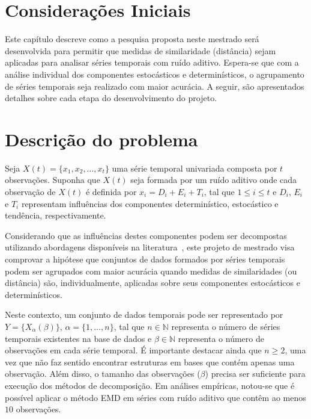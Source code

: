 \label{plano}

\section{Considerações Iniciais}



Este capítulo descreve como a pesquisa proposta neste mestrado será desenvolvida para permitir que medidas de similaridade (distância) sejam aplicadas para analisar séries temporais com ruído aditivo. Espera-se que com a análise individual dos componentes estocásticos e determinísticos, o agrupamento de séries temporais seja realizado com maior acurácia. A seguir, são apresentados detalhes sobre cada etapa do desenvolvimento do projeto.

\section{Descrição do problema}

Seja $X(t) = \{x_1, x_2, \dots, x_t\}$ uma série temporal univariada composta por $t$ observações. Suponha que $X(t)$ seja formada por um ruído aditivo onde cada observação de $X(t)$ é definida por $x_i = D_i + E_i + T_i$, tal que $1 \leq i \leq t$ e $D_i$, $E_i$ e $T_i$ representam influências dos componentes determinístico, estocástico e tendência, respectivamente.

Considerando que as influências destes componentes podem ser decompostas utilizando abordagens disponíveis na literatura~\cite{Araujo2013, Araujo2015}, este projeto de mestrado visa comprovar a hipótese que conjuntos de dados formados por séries temporais podem ser agrupados com maior acurácia quando medidas de similaridades (ou distância) são, individualmente, aplicadas sobre seus componentes estocásticos e determinísticos.

Neste contexto, um conjunto de dados temporais pode ser representado por $Y=\{X_{\alpha}(\beta)\}$, $\alpha = \{1, \dots, n\}$, tal que $n \in \mathbb{N}$ representa o número de séries temporais existentes na base de dados e $\beta \in \mathbb{N}$ representa o número de observações em cada série temporal. É importante destacar ainda que $n \geq 2$, uma vez que não faz sentido encontrar estruturas em bases que contém apenas uma observação. Além disso, o tamanho das observações ($\beta$) precisa ser suficiente para execução dos métodos de decomposição. Em análises empíricas, notou-se que é possível aplicar o método EMD em séries com ruído aditivo que contêm ao menos $10$ observações.

